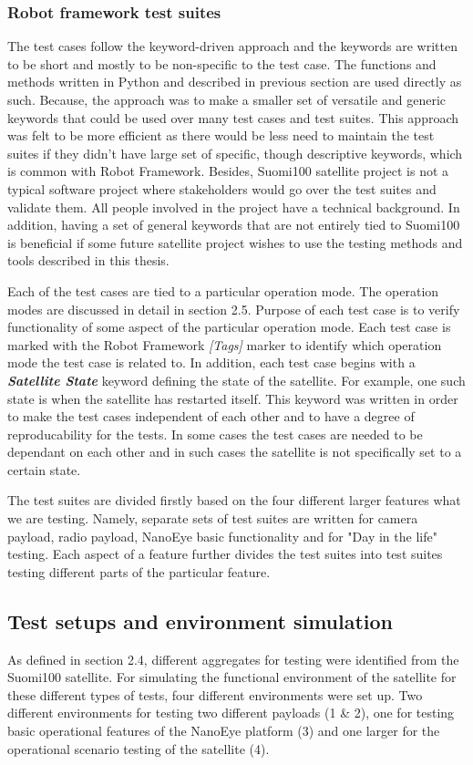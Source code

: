\documentclass[english,12pt,a4paper,pdftex,elec,utf8]{aaltothesis}
\begin{document}
    
\subsubsection{Robot framework test suites}
The test cases follow the keyword-driven approach and the keywords are written to be short and mostly to be non-specific to the test case. The functions and methods written in Python and described in previous section are used directly as such. Because, the approach was to make a smaller set of versatile and generic keywords that could be used over many test cases and test suites. This approach was felt to be more efficient as there would be less need to maintain the test suites if they didn't have large set of specific, though descriptive keywords, which is common with Robot Framework. Besides, Suomi100 satellite project is not a typical software project where stakeholders would go over the test suites and validate them. All people involved in the project have a technical background. In addition, having a set of general keywords that are not entirely tied to Suomi100 is beneficial if some future satellite project wishes to use the testing methods and tools described in this thesis.\par
Each of the test cases are tied to a particular operation mode. The operation modes are discussed in detail in section 2.5. Purpose of each test case is to verify functionality of some aspect of the particular operation mode. Each test case is marked with the Robot Framework \textit{[Tags]} marker to identify which operation mode the test case is related to.
In addition, each test case begins with a \textbf{\textit{Satellite State}} keyword defining the state of the satellite. For example, one such state is when the satellite has restarted itself. This keyword was written in order to make the test cases independent of each other and to have a degree of reproducability for the tests. In some cases the test cases are needed to be dependant on each other and in such cases the satellite is not specifically set to a certain state.\par The test suites are divided firstly based on the four different larger features what we are testing. Namely, separate sets of test suites are written for camera payload, radio payload, NanoEye basic functionality and for "Day in the life" testing. Each aspect of a feature further divides the test suites into test suites testing different parts of the particular feature.\par   
\subsection{Test setups and environment simulation}
As defined in section 2.4, different aggregates for testing were identified from the Suomi100 satellite. For simulating the functional environment of the satellite for these different types of tests, four different environments were set up. Two different environments for testing two different payloads (1 \& 2), one for testing basic operational features of the NanoEye platform (3) and one larger for the operational scenario testing of the satellite (4). 
\end{document}
